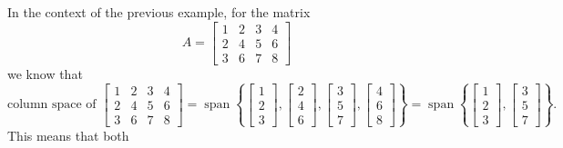 \documentclass{ximera}
\begin{document}
In the context of the previous example, for the matrix
\begin{equation*}
    A = \begin{bmatrix}
        1 & 2 & 3 & 4 \\
        2 & 4 & 5 & 6 \\
        3 & 6 & 7 & 8
    \end{bmatrix} 
\end{equation*}
we know that 
\begin{equation*}
    \text{column space of }
    \begin{bmatrix}
        1 & 2 & 3 & 4 \\
        2 & 4 & 5 & 6 \\
        3 & 6 & 7 & 8
    \end{bmatrix}
    = \operatorname{span} \left\{
    \begin{bmatrix}
        1 \\
        2 \\
        3 
    \end{bmatrix}
    ,
    \begin{bmatrix}
        2 \\
        4 \\
        6
    \end{bmatrix}
    ,
    \begin{bmatrix}
        3 \\
        5 \\
        7
    \end{bmatrix}
    ,
    \begin{bmatrix}
        4 \\
        6 \\
        8
    \end{bmatrix}
    \right\} = \operatorname{span} \left\{
    \begin{bmatrix}
        1 \\
        2 \\
        3
    \end{bmatrix}
    ,
    \begin{bmatrix}
        3 \\
        5 \\
        7
    \end{bmatrix}
    \right\} .
\end{equation*}
This means that both 
\end{document}
